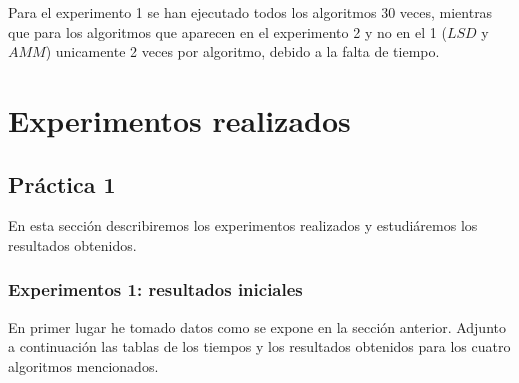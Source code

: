 \documentclass[11pt,a4paper]{article}
\begin{document}
	Para el experimento 1 se han ejecutado todos los algoritmos 30 veces, mientras que para los algoritmos que aparecen en el experimento 2 y no en el 1 ($LSD$ y $AMM$) unicamente 2 veces por algoritmo, debido a la falta de tiempo.
	
	\section{Experimentos realizados}
	
	\subsection{Práctica 1}
	
	En esta sección describiremos los experimentos realizados y estudiáremos los resultados obtenidos. 
	
	\subsubsection{Experimentos 1: resultados iniciales}
	
	En primer lugar he tomado datos como se expone en la sección anterior. Adjunto a continuación las tablas de los tiempos y los resultados obtenidos para los cuatro algoritmos mencionados.
	
\end{document}
